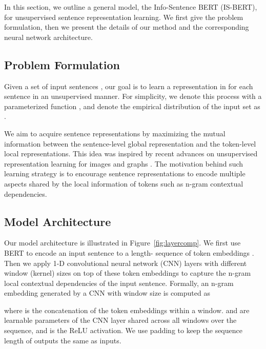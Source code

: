 \documentclass[11pt,a4paper]{article}
\begin{document}
In this section, we outline a general model, the Info-Sentence BERT (IS-BERT), for unsupervised sentence representation learning. We first give the problem formulation, then we present the details of our method and the corresponding neural network architecture. 


\subsection{Problem Formulation} 

Given a set of input sentences , our goal is to learn a representation  in  for each sentence  in an unsupervised manner. For simplicity, we denote this process with a parameterized function , and denote the empirical distribution of the input set  as . 

We aim to acquire sentence representations by maximizing the mutual information between the sentence-level global representation and the token-level local representations. This idea was inspired by recent advances on unsupervised representation learning for images and graphs \citep{hjelm2019,sun2019infograph}. The motivation behind such learning strategy is to encourage sentence representations to encode multiple aspects shared by the local information of tokens such as n-gram contextual dependencies.






\subsection{Model Architecture}
Our model architecture is illustrated in Figure~\ref{fig:layercomp}. 
We first use BERT to encode an input sentence  to a length- sequence of token embeddings . Then we apply 1-D convolutional neural network (CNN) layers with different window (kernel) sizes on top of these token embeddings to capture the n-gram local contextual dependencies of the input sentence. Formally, an n-gram embedding  generated by a CNN with window size  is computed as

where  is the concatenation of the token embeddings within a window.  and  are learnable parameters of the CNN layer shared across all windows over the sequence, and  is the ReLU activation. We use padding to keep the sequence length of outputs the same as inputs. 
\end{document}
